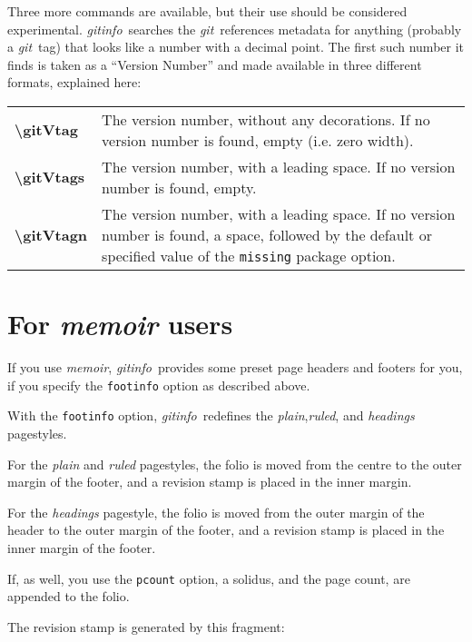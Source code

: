 \documentclass[a4paper,12pt,twoside,openany]{memoir}
\newcommand{\sfit}[1]{\textit{#1}}
\newcommand{\git}{\sfit{git}}
\newcommand{\tpname}{\sfit{gitinfo}}
\begin{document}
\vspace{0.5\baselineskip}
Three more commands are available, but their use should be considered
experimental. \tpname\ searches the \git\ references metadata for
anything (probably a \git\ tag) that looks like a number with a decimal point.
The first such number it finds is taken as a ``Version Number''
and made available in three different formats, explained here:
\vspace{0.5\baselineskip}

\noindent
\begin{tabularx}{\textwidth}{@{}>{\ttfamily\bfseries\textbackslash}lX@{}}
gitVtag&
    The version number, without any decorations. If no version number is found,
    empty (i.e. zero width).
\\
gitVtags&
    The version number, with a leading space. If no version number is found,
    empty.
\\
gitVtagn&
    The version number, with a leading space.
    If no version number is found, a space,
    followed by the default or specified value of
    the \texttt{missing} package option.
\\
\end{tabularx}

\section{For \sfit{memoir} users}
If you use \sfit{memoir}, \tpname\ provides some preset page
headers and footers for you,
if you specify the \texttt{footinfo} option as described above.

With the \texttt{footinfo} option, \tpname\ redefines
the \sfit{plain},\sfit{ruled}, and \sfit{headings} pagestyles.

For the \sfit{plain} and \sfit{ruled} pagestyles,
the folio is moved from the centre to the outer margin of the footer,
and a revision stamp is placed in the inner margin.

For the \sfit{headings} pagestyle,
the folio is moved from the outer margin of the header
to the outer margin of the footer,
and a revision stamp is placed in the inner margin of the footer.

If, as well, you use the \texttt{pcount} option, a solidus, and the page count,
are appended to the folio.

The revision stamp is generated by this fragment:
\vspace{0.5\baselineskip}
\end{document}
